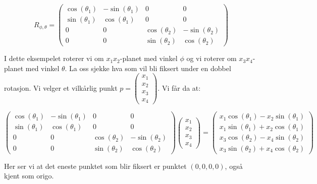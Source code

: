 \documentclass[a4paper,10pt,english]{article}
\begin{document}
    $$
    R_{\phi, \theta} = \left(
    \begin{matrix}
        \cos(\theta_{1}) & -\sin(\theta_{1}) & 0 & 0 \\
        \sin(\theta_{1}) &  \cos(\theta_{1}) & 0 & 0 \\
        0 & 0 & \cos(\theta_{2}) & -\sin(\theta_{2}) \\
        0 & 0 & \sin(\theta_{2}) &  \cos(\theta_{2})
    \end{matrix}
    \right)
    $$

    I dette eksempelet roterer vi om $x_{1}x_{2}$-planet med vinkel $\phi$ og vi roterer om $x_{3}x_{4}$-planet med vinkel $\theta$.
    La oss sjekke hva som vil bli fiksert under en dobbel rotasjon. Vi velger et vilkårlig punkt $p = \left( \begin{smallmatrix} x_{1} \\ x_{2} \\ x_{3} \\ x_{4} \end{smallmatrix} \right)$. Vi får da at:

    $$
    \left(
    \begin{matrix}
        \cos(\theta_{1}) & -\sin(\theta_{1}) & 0 & 0 \\
        \sin(\theta_{1}) &  \cos(\theta_{1}) & 0 & 0 \\
        0 & 0 & \cos(\theta_{2}) & -\sin(\theta_{2}) \\
        0 & 0 & \sin(\theta_{2}) &  \cos(\theta_{2})
    \end{matrix}
    \right)
    \left(
    \begin{matrix}
        x_{1} \\ x_{2} \\ x_{3} \\ x_{4}
    \end{matrix}
    \right) = 
    \left(
    \begin{matrix}
        x_{1}\cos(\theta_{1}) - x_{2}\sin(\theta_{1}) \\
        x_{1}\sin(\theta_{1}) + x_{2}\cos(\theta_{1}) \\
        x_{3}\cos(\theta_{2}) - x_{4}\sin(\theta_{2}) \\
        x_{3}\sin(\theta_{2}) + x_{4}\cos(\theta_{2})
    \end{matrix}
    \right)
    $$

    Her ser vi at det eneste punktet som blir fiksert er punktet $\left( 0, 0, 0, 0 \right)$, også kjent som origo.
\end{document}
